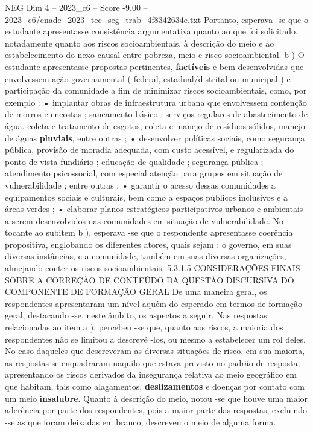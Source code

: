\begin{textsample}{NEG Dim 4 – 2023\_c6 – Score -9.00 – 2023\_c6/enade\_2023\_tec\_seg\_trab\_4f8342634e.txt}
Portanto, esperava -se que o estudante apresentasse consistência argumentativa quanto ao que foi solicitado, notadamente quanto aos riscos socioambientais, à descrição do meio e ao estabelecimento do nexo causal entre pobreza, meio e risco socioambiental. b ) O estudante apresentasse propostas pertinentes, \textbf{factíveis} e bem desenvolvidas que envolvessem ação governamental ( federal, estadual/distrital ou municipal ) e participação da comunidade a fim de minimizar riscos socioambientais, como, por exemplo : • implantar obras de infraestrutura urbana que envolvessem contenção de morros e encostas ; saneamento básico : serviços regulares de abastecimento de água, coleta e tratamento de esgotos, coleta e manejo de resíduos sólidos, manejo de águas \textbf{pluviais}, entre outras ; • desenvolver políticas sociais, como segurança pública, provisão de moradia adequada, com custo acessível, e regularizada do ponto de vista fundiário ; educação de qualidade ; segurança pública ; atendimento psicossocial, com especial atenção para grupos em situação de vulnerabilidade ; entre outras ; • garantir o acesso dessas comunidades a equipamentos sociais e culturais, bem como a espaços públicos inclusivos e a áreas verdes ; • elaborar planos estratégicos participativos urbanos e ambientais a serem desenvolvidos nas comunidades em situação de vulnerabilidade.
No tocante ao subitem b ), esperava -se que o respondente apresentasse coerência propositiva, englobando os diferentes atores, quais sejam : o governo, em suas diversas instâncias, e a comunidade, também em suas diversas organizações, almejando conter os riscos socioambientais. 5.3.1.5 CONSIDERAÇÕES FINAIS SOBRE A CORREÇÃO DE CONTEÚDO DA QUESTÃO DISCURSIVA DO COMPONENTE DE FORMAÇÃO GERAL De uma maneira geral, os respondentes apresentaram um nível aquém do esperado em termos de formação geral, destacando -se, neste âmbito, os aspectos a seguir.
Nas respostas relacionadas ao item a ), percebeu -se que, quanto aos riscos, a maioria dos respondentes não se limitou a descrevê -los, ou mesmo a estabelecer um rol deles.
No caso daqueles que descreveram as diversas situações de risco, em sua maioria, as respostas se enquadraram naquilo que estava previsto no padrão de resposta, apresentando os riscos derivados da insegurança relativa ao meio geográfico em que habitam, tais como alagamentos, \textbf{deslizamentos} e doenças por contato com um meio \textbf{insalubre}.
Quanto à descrição do meio, notou -se que houve uma maior aderência por parte dos respondentes, pois a maior parte das respostas, excluindo -se as que foram deixadas em branco, descreveu o meio de alguma forma.

\end{textsample}
